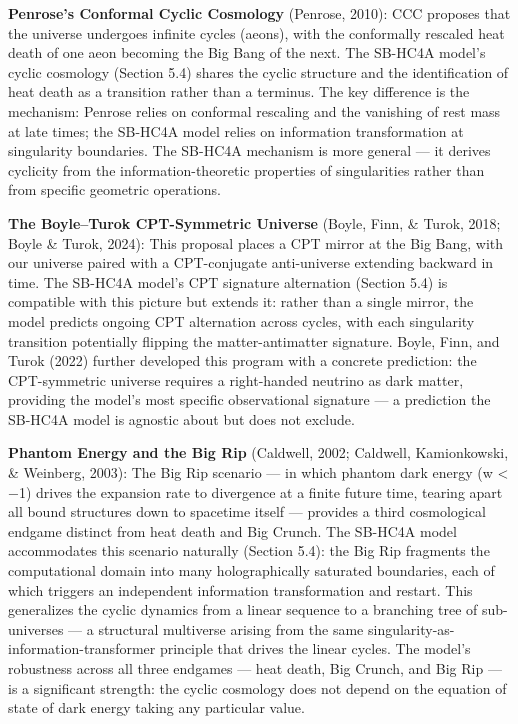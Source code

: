 \documentclass[
]{article}
\begin{document}
\textbf{Penrose's Conformal Cyclic Cosmology} (Penrose, 2010): CCC
proposes that the universe undergoes infinite cycles (aeons), with the
conformally rescaled heat death of one aeon becoming the Big Bang of the
next. The SB-HC4A model's cyclic cosmology (Section 5.4) shares the
cyclic structure and the identification of heat death as a transition
rather than a terminus. The key difference is the mechanism: Penrose
relies on conformal rescaling and the vanishing of rest mass at late
times; the SB-HC4A model relies on information transformation at
singularity boundaries. The SB-HC4A mechanism is more general --- it
derives cyclicity from the information-theoretic properties of
singularities rather than from specific geometric operations.

\textbf{The Boyle--Turok CPT-Symmetric Universe} (Boyle, Finn, \& Turok,
2018; Boyle \& Turok, 2024): This proposal places a CPT mirror at the
Big Bang, with our universe paired with a CPT-conjugate anti-universe
extending backward in time. The SB-HC4A model's CPT signature
alternation (Section 5.4) is compatible with this picture but extends
it: rather than a single mirror, the model predicts ongoing CPT
alternation across cycles, with each singularity transition potentially
flipping the matter-antimatter signature. Boyle, Finn, and Turok (2022)
further developed this program with a concrete prediction: the
CPT-symmetric universe requires a right-handed neutrino as dark matter,
providing the model's most specific observational signature --- a
prediction the SB-HC4A model is agnostic about but does not exclude.

\textbf{Phantom Energy and the Big Rip} (Caldwell, 2002; Caldwell,
Kamionkowski, \& Weinberg, 2003): The Big Rip scenario --- in which
phantom dark energy (w \textless{} −1) drives the expansion rate to
divergence at a finite future time, tearing apart all bound structures
down to spacetime itself --- provides a third cosmological endgame
distinct from heat death and Big Crunch. The SB-HC4A model accommodates
this scenario naturally (Section 5.4): the Big Rip fragments the
computational domain into many holographically saturated boundaries,
each of which triggers an independent information transformation and
restart. This generalizes the cyclic dynamics from a linear sequence to
a branching tree of sub-universes --- a structural multiverse arising
from the same singularity-as-information-transformer principle that
drives the linear cycles. The model's robustness across all three
endgames --- heat death, Big Crunch, and Big Rip --- is a significant
strength: the cyclic cosmology does not depend on the equation of state
of dark energy taking any particular value.
\end{document}
